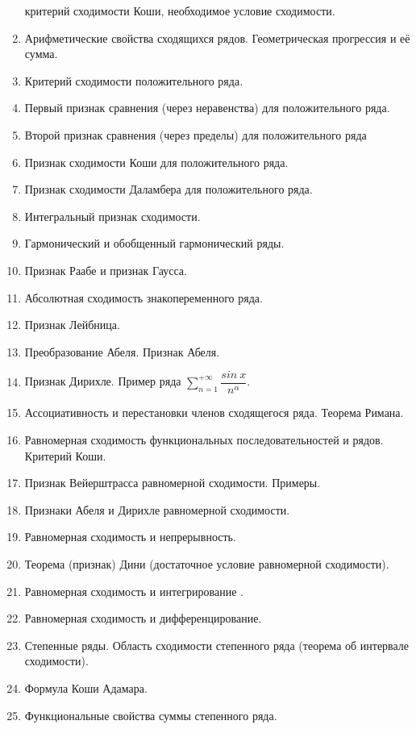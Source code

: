 \documentclass{article}
\begin{document}
\begin{enumerate}
          критерий сходимости Коши, необходимое условие сходимости.
    \item Арифметические свойства сходящихся рядов. Геометрическая
          прогрессия и её сумма.
    \item Критерий сходимости положительного ряда.
    \item Первый признак сравнения (через неравенства) для
          положительного ряда.
    \item Второй признак сравнения (через пределы) для положительного
          ряда
    \item Признак сходимости Коши для положительного ряда.
    \item Признак сходимости Даламбера для положительного ряда.
    \item Интегральный признак сходимости.
    \item Гармонический и обобщенный гармонический ряды.
    \item Признак Раабе и признак Гаусса.
    \item Абсолютная сходимость знакопеременного ряда.
    \item Признак Лейбница.
    \item Преобразование Абеля. Признак Абеля.
    \item Признак Дирихле. Пример ряда $\sum\limits_{n=1}^{+\infty}\dfrac{sin\ x}{n^\alpha}$.
    \item Ассоциативность и перестановки членов сходящегося ряда.
          Теорема Римана.
    \item Равномерная сходимость функциональных последовательностей и
          рядов. Критерий Коши.
    \item Признак Вейерштрасса равномерной сходимости. Примеры.
    \item Признаки Абеля и Дирихле равномерной сходимости.
    \item Равномерная сходимость и непрерывность.
    \item Теорема (признак) Дини (достаточное условие равномерной
          сходимости).
    \item Равномерная сходимость и интегрирование .
    \item Равномерная сходимость и дифференцирование.
    \item Степенные ряды. Область сходимости степенного ряда (теорема
          об интервале сходимости).
    \item Формула Коши Адамара.
    \item Функциональные свойства суммы степенного ряда.

\end{enumerate}
\end{document}
